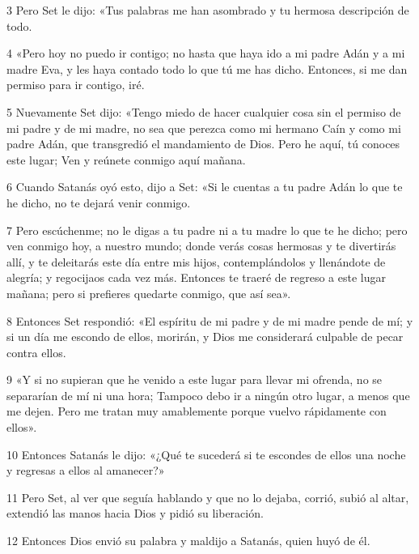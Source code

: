 \par 3 Pero Set le dijo: «Tus palabras me han asombrado y tu hermosa descripción de todo.

\par 4 «Pero hoy no puedo ir contigo; no hasta que haya ido a mi padre Adán y a mi madre Eva, y les haya contado todo lo que tú me has dicho. Entonces, si me dan permiso para ir contigo, iré.

\par 5 Nuevamente Set dijo: «Tengo miedo de hacer cualquier cosa sin el permiso de mi padre y de mi madre, no sea que perezca como mi hermano Caín y como mi padre Adán, que transgredió el mandamiento de Dios. Pero he aquí, tú conoces este lugar; Ven y reúnete conmigo aquí mañana.

\par 6 Cuando Satanás oyó esto, dijo a Set: «Si le cuentas a tu padre Adán lo que te he dicho, no te dejará venir conmigo.

\par 7 Pero escúchenme; no le digas a tu padre ni a tu madre lo que te he dicho; pero ven conmigo hoy, a nuestro mundo; donde verás cosas hermosas y te divertirás allí, y te deleitarás este día entre mis hijos, contemplándolos y llenándote de alegría; y regocijaos cada vez más. Entonces te traeré de regreso a este lugar mañana; pero si prefieres quedarte conmigo, que así sea».

\par 8 Entonces Set respondió: «El espíritu de mi padre y de mi madre pende de mí; y si un día me escondo de ellos, morirán, y Dios me considerará culpable de pecar contra ellos.

\par 9 «Y si no supieran que he venido a este lugar para llevar mi ofrenda, no se separarían de mí ni una hora; Tampoco debo ir a ningún otro lugar, a menos que me dejen. Pero me tratan muy amablemente porque vuelvo rápidamente con ellos».

\par 10 Entonces Satanás le dijo: «¿Qué te sucederá si te escondes de ellos una noche y regresas a ellos al amanecer?»

\par 11 Pero Set, al ver que seguía hablando y que no lo dejaba, corrió, subió al altar, extendió las manos hacia Dios y pidió su liberación.

\par 12 Entonces Dios envió su palabra y maldijo a Satanás, quien huyó de él.

